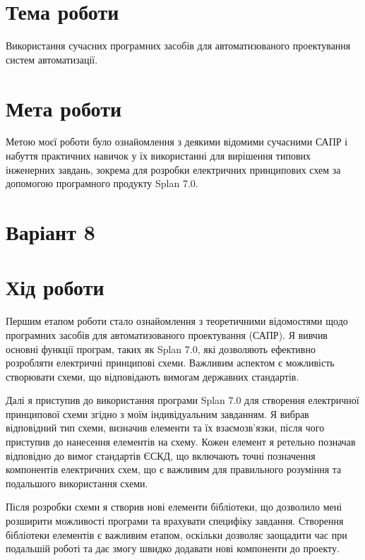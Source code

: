 \documentclass[a4paper]{article}
\begin{document}

    \section*{Тема роботи}
    Використання сучасних програмних засобів для автоматизованого проектування систем автоматизації.

    \section*{Мета роботи} 
    Метою моєї роботи було ознайомлення з деякими відомими сучасними САПР і набуття практичних навичок 
    у їх використанні для вирішення типових інженерних завдань, зокрема для розробки електричних 
    принципових схем за допомогою програмного продукту Splan 7.0.
 
    \section*{Варіант 8}

    \section*{Хід роботи}
    Першим етапом роботи стало ознайомлення з теоретичними відомостями щодо програмних засобів для 
    автоматизованого проектування (САПР). Я вивчив основні функції програм, таких як Splan 7.0, які 
    дозволяють ефективно розробляти електричні принципові схеми. Важливим аспектом є можливість 
    створювати схеми, що відповідають вимогам державних стандартів.

    Далі я приступив до використання програми Splan 7.0 для створення електричної принципової схеми 
    згідно з моїм індивідуальним завданням. Я вибрав відповідний тип схеми, визначив елементи та їх 
    взаємозв'язки, після чого приступив до нанесення елементів на схему. Кожен елемент я ретельно 
    позначав відповідно до вимог стандартів ЄСКД, що включають точні позначення компонентів електричних 
    схем, що є важливим для правильного розуміння та подальшого використання схеми.

    Після розробки схеми я створив нові елементи бібліотеки, що дозволило мені розширити можливості 
    програми та врахувати специфіку завдання. Створення бібліотеки елементів є важливим етапом, 
    оскільки дозволяє заощадити час при подальшій роботі та дає змогу швидко додавати нові компоненти 
    до проекту.
\end{document}
